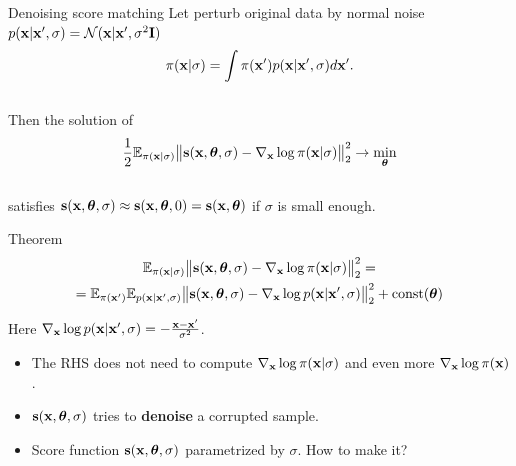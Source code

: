 \begin{frame}{Denoising score matching}
	Let perturb original data by normal noise $p(\mathbf{x} | \mathbf{x}', \sigma) = \mathcal{N}(\mathbf{x} | \mathbf{x}', \sigma^2 \mathbf{I})$
	\vspace{-0.3cm}
	\[
		\pi(\mathbf{x} | \sigma) = \int \pi(\mathbf{x}') p(\mathbf{x} | \mathbf{x}', \sigma) d\mathbf{x}'.
	\]
	\vspace{-0.6cm} \\
	Then the solution of 
	\vspace{-0.2cm}
	\[
		\frac{1}{2} \mathbb{E}_{\pi(\mathbf{x} | \sigma)}\bigl\| \mathbf{s}(\mathbf{x}, \boldsymbol{\theta}, \sigma) - \nabla_{\mathbf{x}} \log \pi(\mathbf{x} | \sigma) \bigr\|^2_2 \rightarrow \min_{\boldsymbol{\theta}}
	\]
	\vspace{-0.5cm} \\
	satisfies $\mathbf{s}(\mathbf{x}, \boldsymbol{\theta}, \sigma) \approx \mathbf{s}(\mathbf{x}, \boldsymbol{\theta}, 0) = \mathbf{s}(\mathbf{x}, \boldsymbol{\theta})$ if $\sigma$ is small enough.
	\begin{block}{Theorem}
	\vspace{-0.8cm}
	\begin{multline*}
		\mathbb{E}_{\pi(\mathbf{x} | \sigma)}\bigl\| \mathbf{s}(\mathbf{x}, \boldsymbol{\theta}, \sigma) - \nabla_{\mathbf{x}} \log \pi(\mathbf{x} | \sigma) \bigr\|^2_2 = \\ = \mathbb{E}_{\pi(\mathbf{x}')} \mathbb{E}_{p(\mathbf{x} | \mathbf{x}', \sigma)}\bigl\| \mathbf{s}(\mathbf{x}, \boldsymbol{\theta}, \sigma) - \nabla_{\mathbf{x}} \log p(\mathbf{x} | \mathbf{x}', \sigma) \bigr\|^2_2 + \text{const}(\boldsymbol{\theta})
	\end{multline*}
	\vspace{-0.8cm}
	\end{block}
	Here $\nabla_{\mathbf{x}} \log p(\mathbf{x} | \mathbf{x}', \sigma) = - \frac{\mathbf{x} - \mathbf{x}'}{\sigma^2}$.
	\begin{itemize}
		\item The RHS does not need to compute $\nabla_{\mathbf{x}} \log \pi(\mathbf{x} | \sigma)$ and even more $\nabla_{\mathbf{x}} \log \pi(\mathbf{x})$.
		\item $\mathbf{s}(\mathbf{x}, \boldsymbol{\theta}, \sigma)$ tries to \textbf{denoise} a corrupted sample.
		\item Score function $\mathbf{s}(\mathbf{x}, \boldsymbol{\theta}, \sigma)$ parametrized by $\sigma$. How to make it?
	\end{itemize}
\end{frame}
